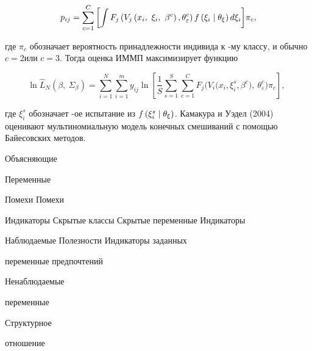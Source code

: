 \begin{equation} \label{GrindEQ__15_44_} p_{ij}=\sum^C_{c=1}{\left[\int{F_j\left(V_j\left(x_i,\ {\xi }_i,\ {\beta }^c\right),{\theta }^c_{\varepsilon }\right)f\left({\xi }_i\mathrel{\left|\vphantom{{\xi }_i {\theta }_{\xi }}\right.\kern-\nulldelimiterspace}{\theta }_{\xi }\right)d{\xi }_i}\right]}{\pi }_c, \end{equation} 

где ${\pi }_c$ обозначает вероятность принадлежности индивида к -му классу, и обычно $c=2$или $c=3$. Тогда оценка ИММП максимизирует функцию

\[{\ln  {\hat{L}}_N(\beta ,\ {\Sigma }_{\beta })=\sum^N_{i=1}{\sum^m_{i=1}{y_{ij}{\ln  \left[\frac{1}{S}\sum^S_{s=1}{\sum^C_{c=1}{F_j(V_i(}x_i,{\xi }^s_i,{\beta }^c),\ {\theta }^c_{\varepsilon }){\pi }_c}\right],\ }}}\ }\] 

где ${\xi }^s_i$ обозначает -ое испытание из $f\left({\xi }^s_i\mathrel{\left|\vphantom{{\xi }^s_i {\theta }_{\xi }}\right.\kern-\nulldelimiterspace}{\theta }_{\xi }\right)$. Камакура и Уэдел (2004) оценивают мультиномиальную модель конечных смешиваний с помощью Байесовских методов.













Объясняющие 

Переменные



Помехи   Помехи



Индикаторы    Скрытые классы                                      Скрытые переменные           Индикаторы



Наблюдаемые                                  Полезности                                          Индикаторы заданных

переменные                                                                                                                    предпочтений 



                          Ненаблюдаемые 

                          переменные



                          Структурное 

                          отношение



